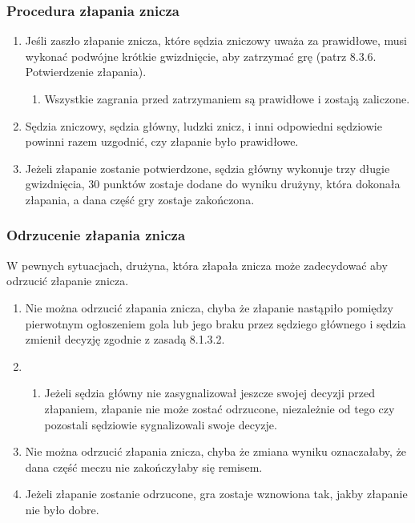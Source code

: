 \documentclass[12pt]{article}
\begin{document}
\subsubsection{Procedura złapania znicza}

\begin{enumerate}
	\item
	      Jeśli zaszło złapanie znicza, które sędzia zniczowy uważa za
	      prawidłowe, musi wykonać podwójne krótkie gwizdnięcie, aby zatrzymać
	      grę (patrz 8.3.6. Potwierdzenie złapania).

	      \begin{enumerate}
		      \item
		            Wszystkie zagrania przed zatrzymaniem są prawidłowe i zostają
		            zaliczone.
	      \end{enumerate}
	\item
	      Sędzia zniczowy, sędzia główny, ludzki znicz, i inni odpowiedni
	      sędziowie powinni razem uzgodnić, czy złapanie było prawidłowe.
	\item
	      Jeżeli złapanie zostanie potwierdzone, sędzia główny wykonuje trzy
	      długie gwizdnięcia, 30 punktów zostaje dodane do wyniku drużyny, która
	      dokonała złapania, a dana część gry zostaje zakończona.
\end{enumerate}

\subsubsection{Odrzucenie złapania znicza}

W pewnych sytuacjach, drużyna, która złapała znicza może zadecydować aby
odrzucić złapanie znicza.

\begin{enumerate}
	\item
	      Nie można odrzucić złapania znicza, chyba że złapanie nastąpiło
	      pomiędzy pierwotnym ogłoszeniem gola lub jego braku przez sędziego
	      głównego i sędzia zmienił decyzję zgodnie z zasadą 8.1.3.2.\item

	      \begin{enumerate}
		      \item
		            Jeżeli sędzia główny nie zasygnalizował jeszcze swojej decyzji przed
		            złapaniem, złapanie nie może zostać odrzucone, niezależnie od tego
		            czy pozostali sędziowie sygnalizowali swoje decyzje.
	      \end{enumerate}
	\item
	      Nie można odrzucić złapania znicza, chyba że zmiana wyniku
	      oznaczałaby, że dana część meczu nie zakończyłaby się remisem.
	\item
	      Jeżeli złapanie zostanie odrzucone, gra zostaje wznowiona tak, jakby
	      złapanie nie było dobre.
\end{enumerate}
\end{document}
